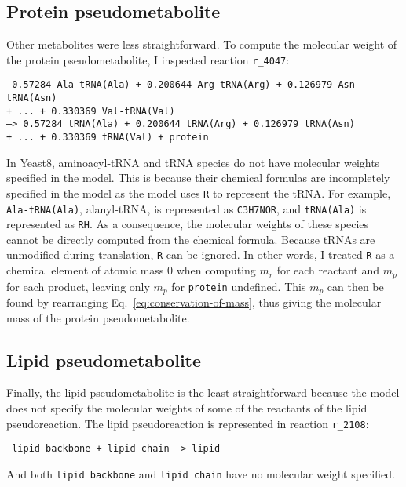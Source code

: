\subsection{Protein pseudometabolite}
\label{append:model-molweights-protein}

Other metabolites were less straightforward.
To compute the molecular weight of the protein pseudometabolite, I inspected reaction \texttt{r\_4047}:

\texttt{
  0.57284 Ala-tRNA(Ala) + 0.200644 Arg-tRNA(Arg) + 0.126979 Asn-tRNA(Asn)\\
  + ... + 0.330369 Val-tRNA(Val) \\
  --> 0.57284 tRNA(Ala) + 0.200644 tRNA(Arg) + 0.126979 tRNA(Asn) \\
  + ... + 0.330369 tRNA(Val) + protein
}

In Yeast8, aminoacyl-tRNA and tRNA species do not have molecular weights specified in the model.
This is because their chemical formulas are incompletely specified in the model as the model uses \texttt{R} to represent the tRNA\@.
For example, \texttt{Ala-tRNA(Ala)}, alanyl-tRNA, is represented as \texttt{C3H7NOR}, and \texttt{tRNA(Ala)} is represented as \texttt{RH}.
As a consequence, the molecular weights of these species cannot be directly computed from the chemical formula.
Because tRNAs are unmodified during translation, \texttt{R} can be ignored.
In other words, I treated \texttt{R} as a chemical element of atomic mass 0 when computing $m_{r}$ for each reactant and $m_{p}$ for each product, leaving only $m_{p}$ for \texttt{protein} undefined.
This $m_{p}$ can then be found by rearranging Eq.\ \ref{eq:conservation-of-mass}, thus giving the molecular mass of the protein pseudometabolite.


\subsection{Lipid pseudometabolite}
\label{subsubsec:model-molweights-lipid}

Finally, the lipid pseudometabolite is the least straightforward because the model does not specify the molecular weights of some of the reactants of the lipid pseudoreaction.
The lipid pseudoreaction is represented in reaction \texttt{r\_2108}:

\texttt{
  lipid backbone + lipid chain --> lipid
}

And both \texttt{lipid backbone} and \texttt{lipid chain} have no molecular weight specified.

